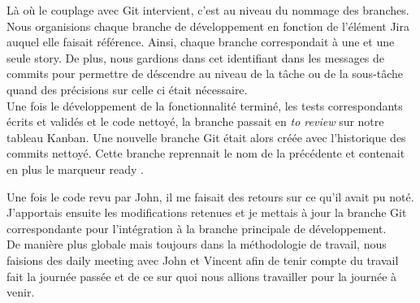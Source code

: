 Là où le couplage avec Git intervient, c'est au niveau du nommage des branches.
Nous organisions chaque branche de développement en fonction de l'élément Jira
auquel elle faisait référence. Ainsi, chaque branche correspondait à une et une
seule story. De plus, nous gardions dans cet identifiant dans les messages de
commits pour permettre de déscendre au niveau de la tâche ou de la sous-tâche
quand des précisions sur celle ci était nécessaire.\\

Une fois le développement de la fonctionnalité terminé, les tests correspondants
écrits et validés et le code nettoyé, la branche passait en {\em \og to review
\fg{} } sur notre tableau Kanban. Une nouvelle branche Git était alors créée
avec l'historique des commits nettoyé. Cette branche reprennait le nom de la
précédente et contenait en plus le marqueur \og ready \fg{}.

Une fois le code revu par John, il me faisait des retours sur ce qu'il avait pu
noté. J'apportais ensuite les modifications retenues et je mettais à jour la
branche Git correspondante pour l'intégration à la branche principale de
développement.\\

De manière plus globale mais toujours dans la méthodologie de travail, nous
faisions des \og daily meeting \fg{} avec John et Vincent afin de tenir compte du
travail fait la journée passée et de ce sur quoi nous allions travailler pour la
journée à venir.


